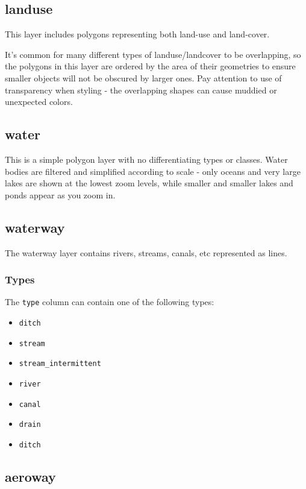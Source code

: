 \subsection*{landuse}\label{landuse}

This layer includes polygons representing both land-use and land-cover.

It's common for many different types of landuse/landcover to be
overlapping, so the polygons in this layer are ordered by the area of
their geometries to ensure smaller objects will not be obscured by
larger ones. Pay attention to use of transparency when styling - the
overlapping shapes can cause muddied or unexpected colors.

\subsection*{water}\label{water}

This is a simple polygon layer with no differentiating types or classes.
Water bodies are filtered and simplified according to scale - only
oceans and very large lakes are shown at the lowest zoom levels, while
smaller and smaller lakes and ponds appear as you zoom in.

\subsection*{waterway}\label{waterway}

The waterway layer contains rivers, streams, canals, etc represented as
lines.

\subsubsection*{Types}\label{types}

The \texttt{type} column can contain one of the following types:

\begin{itemize}
\item
  \texttt{ditch}
\item
  \texttt{stream}
\item
  \texttt{stream\_intermittent}
\item
  \texttt{river}
\item
  \texttt{canal}
\item
  \texttt{drain}
\item
  \texttt{ditch}
\end{itemize}

\subsection*{aeroway}\label{aeroway}

